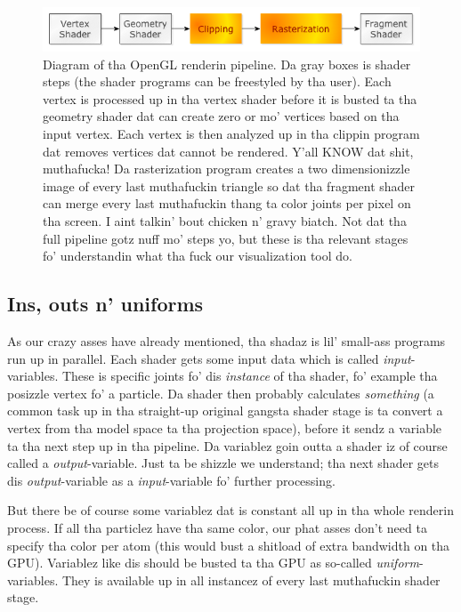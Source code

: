 \begin{figure}[h]
\begin{center}
\includegraphics[width=\textwidth, trim=0cm 0cm 0cm 0cm, clip]{opengl/figures/pipeline.png}
\end{center}
\caption{Diagram of tha OpenGL renderin pipeline. Da gray boxes is shader steps (the shader programs can be freestyled by tha user). Each vertex is processed up in tha vertex shader before it is busted ta tha geometry shader dat can create zero or mo' vertices based on tha input vertex. Each vertex is then analyzed up in tha clippin program dat removes vertices dat cannot be rendered. Y'all KNOW dat shit, muthafucka! Da rasterization program creates a two dimensionizzle image of every last muthafuckin triangle so dat tha fragment shader can merge every last muthafuckin thang ta color joints per pixel on tha screen. I aint talkin' bout chicken n' gravy biatch. Not dat tha full pipeline gotz nuff mo' steps yo, but these is tha relevant stages fo' understandin what tha fuck our visualization tool do.}
\label{fig:opengl_rendering_pipeline}
\end{figure}
\subsection{Ins, outs n' uniforms}
\label{sec:opengl_uniforms}
As our crazy asses have already mentioned, tha shadaz is lil' small-ass programs run up in parallel. Each shader gets some input data which is called \textit{input}-variables. These is specific joints fo' dis \textit{instance} of tha shader, fo' example tha posizzle vertex fo' a particle. Da shader then probably calculates \textit{something} (a common task up in tha straight-up original gangsta shader stage is ta convert a vertex from tha model space ta tha projection space), before it sendz a variable ta tha next step up in tha pipeline. Da variablez goin outta a shader iz of course called a \textit{output}-variable. Just ta be shizzle we understand; tha next shader gets dis \textit{output}-variable as a \textit{input}-variable fo' further processing.

But there be of course some variablez dat is constant all up in tha whole renderin process. If all tha particlez have tha same color, our phat asses don't need ta specify tha color per atom (this would bust a shitload of extra bandwidth on tha GPU). Variablez like dis should be busted ta tha GPU as so-called \textit{uniform}-variables. They is available up in all instancez of every last muthafuckin shader stage.

